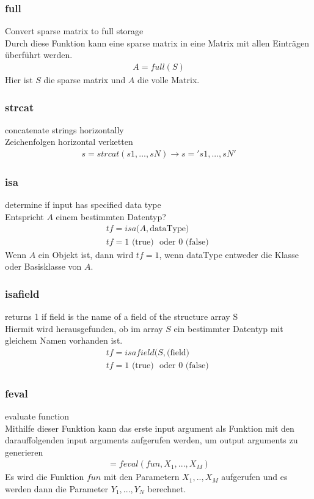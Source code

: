 \documentclass[12pt,bibstyle=none,pagenumberinfooter]{ifmdocument}
\begin{document}
\subsubsection{full}
\glqq Convert sparse matrix to full storage\grqq{}\\
Durch diese Funktion kann eine \glqq sparse matrix\grqq{} in eine Matrix mit allen Eintr\"agen \"uberf\"uhrt werden.  
\begin{gather*}
	A = full(S)
\end{gather*}
Hier ist $S$ die \glqq sparse matrix\grqq{} und $A$ die volle Matrix. 
\subsubsection{strcat}
\glqq concatenate strings horizontally\grqq{}\\
Zeichenfolgen horizontal verketten
\begin{gather*}
	s=strcat(s1, ... , sN) \rightarrow s = 's1, ... , sN'
\end{gather*}
\subsubsection{isa}
\glqq determine if input has specified data type\grqq{}\\
Entspricht $A$ einem bestimmten Datentyp?
\begin{gather*}
	tf = isa(A,\text{dataType)} \\
	tf = 1 \text{ (true) } \text{ oder } 0 \text{ (false) }
\end{gather*}
Wenn $A$ ein Objekt ist, dann wird $tf=1$, wenn \glqq dataType\grqq{} entweder die Klasse oder Basisklasse von $A$.
\subsubsection{isafield}
\glqq  returns 1 if field is the name of a field of the structure array S\grqq{}\\
Hiermit wird herausgefunden, ob im array $S$ ein bestimmter Datentyp mit gleichem Namen vorhanden ist.
\begin{gather*}
	tf = isafield(S,\text{(field)} \\
	tf = 1 \text{ (true) } \text{ oder } 0 \text{ (false) }
\end{gather*}
\subsubsection{feval}\label{subsubsec:matlabFeval}
\glqq evaluate function\grqq{}\\
Mithilfe dieser Funktion kann das erste \glqq input argument\grqq{} als Funktion mit den darauffolgenden \glqq input arguments\grqq{} aufgerufen werden, um \glqq output arguments\grqq{} zu generieren
\begin{gather*}
	[y_1, ..., y_N] = feval(fun, X_1, ..., X_M)
\end{gather*}
Es wird die Funktion $fun$ mit den Parametern $X_1, .., X_M$ aufgerufen und es werden dann die Parameter $Y_1, ..., Y_N$ berechnet. 
\end{document}
